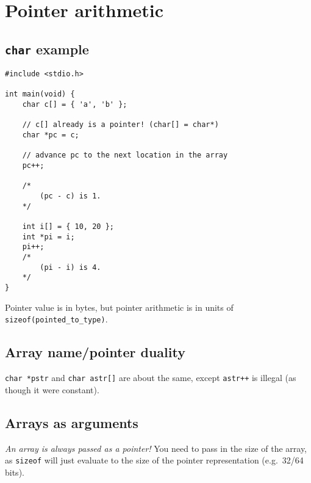 \section{Pointer arithmetic}
\subsection{\texttt{char} example}
\begin{verbatim}
#include <stdio.h>

int main(void) {
	char c[] = { 'a', 'b' };
	
	// c[] already is a pointer! (char[] = char*)
	char *pc = c;
	
	// advance pc to the next location in the array
	pc++;
	
	/*
		(pc - c) is 1.
	*/
	
	int i[] = { 10, 20 };
	int *pi = i;
	pi++;
	/*
		(pi - i) is 4.
	*/
}
\end{verbatim}
Pointer value is in bytes, but pointer arithmetic is in units of \texttt{sizeof(pointed\_to\_type)}.

\subsection{Array name/pointer duality}
\texttt{char *pstr} and \texttt{char astr[]} are about the same, except \texttt{astr++} is illegal (as though it were constant).

\subsection{Arrays as arguments}
\emph{An array is always passed as a pointer!} You need to pass in the size of the array, as \texttt{sizeof} will just evaluate to the size of the pointer representation (e.g.~32/64 bits).